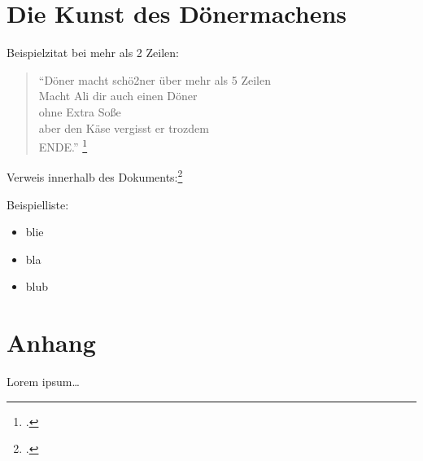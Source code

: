 \section{Die Kunst des Dönermachens}

Beispielzitat bei mehr als 2 Zeilen:
\begin{quote}
"`Döner macht schö2ner über mehr als 5 Zeilen\\
Macht Ali dir auch einen Döner \\
ohne Extra Soße \\
aber den Käse vergisst er trozdem\\
ENDE."' 
\footcite[Wörtlich übernommen von Ali]{praxishandbuch:bpmn2}
\end{quote}
Verweis innerhalb des Dokuments:\footcite[Vgl. \ref{Referenz} auf Seite
\pageref{Referenz} ]{testarticle}


Beispielliste:

\begin{itemize}
\item blie
\item bla
\item blub
\end{itemize}



\begin{figure}[H]
\begin{minipage}{\linewidth}
\begin{center}
\end{center}
\end{minipage}
\end{figure}

\clearpage
\section{Anhang}

Lorem ipsum\ldots
